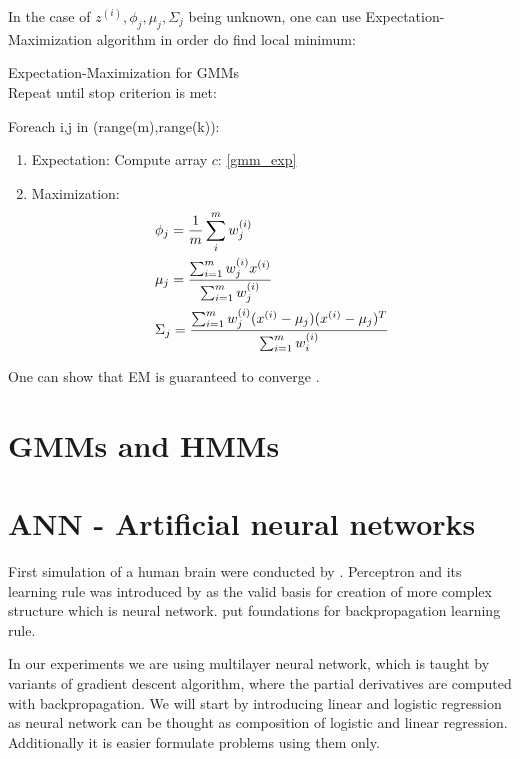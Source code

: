 In the case of $z^{(i)}, \phi_j, \mu_j, \Sigma_j$ being unknown, one can use Expectation-Maximization algorithm in order do find local minimum: 

\begin{algorithm} Expectation-Maximization for GMMs \\
Repeat until stop criterion is met:
\begin{indenva}
Foreach i,j in (range(m),range(k)):
\begin{indenvb}
	\begin{enumerate}
\item Expectation: 
	Compute array $c$: \eqref{gmm_exp}  
\item Maximization: 
	\begin{align}
		& \phi_j = \frac{1}{m}\operatorname*{\sum}_i^m w^{(i)}_j  \\
		& \mu_j = \frac{\operatorname*{\sum}^m_{i=1}w^{(i)}_jx^{(i)}}{\operatorname*{\sum}^m_{i=1}w^{(i)}_j} \\
		& \Sigma_j = \frac{\sum_{i=1}^m w^{(i)}_j(x^{(i)}-\mu_j)(x^{(i)}-\mu_j)^T}{\sum_{i=1}^m w^{(i)}_i}
	\end{align}
	\end{enumerate}
\end{indenvb}
\end{indenva}
\end{algorithm}
One can show that EM is guaranteed to converge \parencite{ng_cs229_2000}.


\section{GMMs and HMMs}



\section{ANN - Artificial neural networks}
First simulation of a human brain were conducted by \textcite{mcculloch}. Perceptron and its learning rule was introduced by \textcite{rosenblatt} as the valid basis for creation of more complex structure which is neural network. \textcite{hebb1} put foundations for backpropagation learning rule.

In our experiments we are using multilayer neural network, which is taught by variants of gradient descent algorithm, where the partial derivatives are computed with backpropagation. We will start by introducing linear and logistic regression as neural network can be thought as composition of logistic and linear regression. Additionally it is easier formulate problems using them only.

